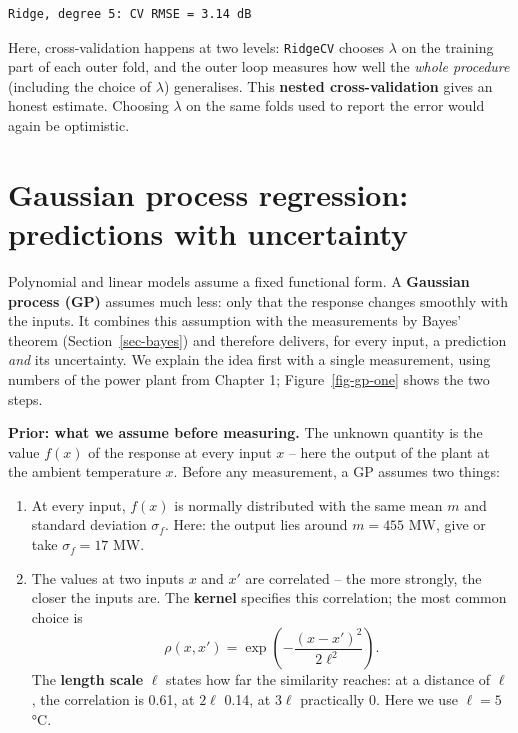 \documentclass[
  letterpaper,
  DIV=11,
  numbers=noendperiod]{scrreprt}
\providecommand{\tightlist}{%
  \setlength{\itemsep}{0pt}\setlength{\parskip}{0pt}}\usepackage{longtable,booktabs,array}
\begin{document}
\begin{verbatim}
Ridge, degree 5: CV RMSE = 3.14 dB
\end{verbatim}

\begin{tcolorbox}[enhanced jigsaw, left=2mm, title=\textcolor{quarto-callout-tip-color}{\faLightbulb}\hspace{0.5em}{Engineering practice: nested model selection}, opacityback=0, breakable, rightrule=.15mm, arc=.35mm, toptitle=1mm, colbacktitle=quarto-callout-tip-color!10!white, opacitybacktitle=0.6, coltitle=black, colframe=quarto-callout-tip-color-frame, bottomrule=.15mm, leftrule=.75mm, bottomtitle=1mm, titlerule=0mm, toprule=.15mm, colback=white]

Here, cross-validation happens at two levels: \texttt{RidgeCV} chooses
\(\lambda\) on the training part of each outer fold, and the outer loop
measures how well the \emph{whole procedure} (including the choice of
\(\lambda\)) generalises. This \textbf{nested cross-validation} gives an
honest estimate. Choosing \(\lambda\) on the same folds used to report
the error would again be optimistic.

\end{tcolorbox}

\section{Gaussian process regression: predictions with
uncertainty}\label{gaussian-process-regression-predictions-with-uncertainty}

Polynomial and linear models assume a fixed functional form. A
\textbf{Gaussian process (GP)} assumes much less: only that the response
changes smoothly with the inputs. It combines this assumption with the
measurements by Bayes' theorem (Section~\ref{sec-bayes}) and therefore
delivers, for every input, a prediction \emph{and} its uncertainty. We
explain the idea first with a single measurement, using numbers of the
power plant from Chapter 1; Figure~\ref{fig-gp-one} shows the two steps.

\textbf{Prior: what we assume before measuring.} The unknown quantity is
the value \(f(x)\) of the response at every input \(x\) -- here the
output of the plant at the ambient temperature \(x\). Before any
measurement, a GP assumes two things:

\begin{enumerate}
\def\labelenumi{\arabic{enumi}.}
\tightlist
\item
  At every input, \(f(x)\) is normally distributed with the same mean
  \(m\) and standard deviation \(\sigma_f\). Here: the output lies
  around \(m = 455\) MW, give or take \(\sigma_f = 17\) MW.
\item
  The values at two inputs \(x\) and \(x'\) are correlated -- the more
  strongly, the closer the inputs are. The \textbf{kernel} specifies
  this correlation; the most common choice is
  \[\rho(x, x') = \exp\left(-\frac{(x - x')^2}{2\ell^2}\right).\] The
  \textbf{length scale} \(\ell\) states how far the similarity reaches:
  at a distance of \(\ell\), the correlation is 0.61, at \(2\ell\) 0.14,
  at \(3\ell\) practically 0. Here we use \(\ell = 5\) °C.
\end{enumerate}
\end{document}
